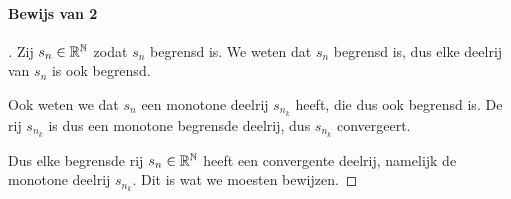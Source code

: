 \paragraph{Bewijs van 2}

\begin{proof}[\unskip\nopunct]

Zij $s_{n}\in\mathbb{R}^{\mathbb{N}}$ zodat $s_{n}$ begrensd is. We weten dat $s_{n}$ begrensd is, dus elke deelrij van $s_{n}$ is ook begrensd. \bigskip

\noindent Ook weten we dat $s_{n}$ een monotone deelrij $s_{n_{k}}$ heeft, die dus ook begrensd is. De rij $s_{n_{k}}$ is dus een monotone begrensde deelrij, dus $s_{n_{k}}$ convergeert. \bigskip

\noindent Dus elke begrensde rij $s_{n}\in\mathbb{R}^{\mathbb{N}}$ heeft een convergente deelrij, namelijk de monotone deelrij $s_{n_{k}}$. Dit is wat we moesten bewijzen.

\end{proof}